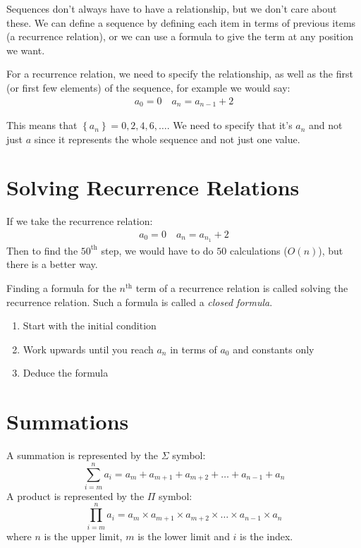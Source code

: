 Sequences don't always have to have a relationship, but we don't care about these.
We can define a sequence by defining each item in terms of previous items (a recurrence relation), or we can use a formula to give the term at any position we want.

For a recurrence relation, we need to specify the relationship, as well as the first (or first few elements) of the sequence, for example we would say:
\begin{align*}
    a_0 = 0 \quad a_n = a_{n-1} + 2
\end{align*}
\begin{note}
    This means that \(\left\{a_n\right\}=0, 2, 4, 6, \ldots\). We need to specify that it's \(a_n\) and not just \(a\) since it represents the whole sequence and not just one value.
\end{note}

\section{Solving Recurrence Relations}\label{sec:solving_recurrence_relations}

If we take the recurrence relation:
\begin{align*}
    a_0 = 0 \quad a_n = a_{n_1}+2
\end{align*}
Then to find the \(50^{\text{th}}\) step, we would have to do \(50\) calculations (\(O(n)\)), but there is a better way.

Finding a formula for the \(n^{\text{th}}\) term of a recurrence relation is called solving the recurrence relation.
Such a formula is called a \emph{closed formula}.
\begin{enumerate}
    \item Start with the initial condition
    \item Work upwards until you reach \(a_n\) in terms of \(a_0\) and constants only
    \item Deduce the formula
\end{enumerate}

\section{Summations}\label{sec:summations}

A summation is represented by the \(\Sigma\) symbol:
\[
    \sum^{n}_{i=m} a_{i} = a_m + a_{m+1} + a_{m+2} + \dots + a_{n-1} + a_{n}
\]
A product is represented by the \(\Pi\) symbol:
\[
    \prod^{n}_{i=m} a_{i} = a_m \times a_{m+1} \times a_{m+2} \times \dots \times a_{n-1} \times a_{n}
\]
where \(n\) is the upper limit, \(m\) is the lower limit and \(i\) is the index.

